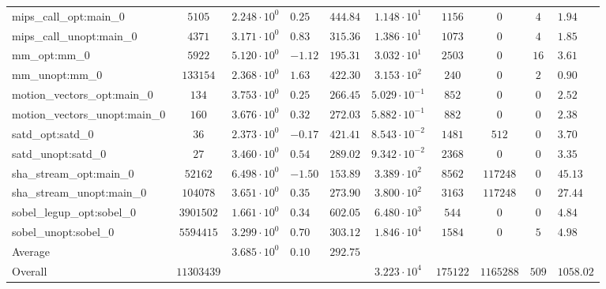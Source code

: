 \begin{tabular}{|l|c|HHc|c|c|c|cH|}
mips\_call\_opt:main\_0                         & $ 5105     $ & $ 2.248 \cdot 10^{0} $ & $ 0.25  $ & $ 444.84 $ & $ 1.148 \cdot 10^{1}  $ & $ 1156   $ & $ 0       $ & $ 4   $ & $ 1.94    $ \\
mips\_call\_unopt:main\_0                       & $ 4371     $ & $ 3.171 \cdot 10^{0} $ & $ 0.83  $ & $ 315.36 $ & $ 1.386 \cdot 10^{1}  $ & $ 1073   $ & $ 0       $ & $ 4   $ & $ 1.85    $ \\
mm\_opt:mm\_0                                   & $ 5922     $ & $ 5.120 \cdot 10^{0} $ & $ -1.12 $ & $ 195.31 $ & $ 3.032 \cdot 10^{1}  $ & $ 2503   $ & $ 0       $ & $ 16  $ & $ 3.61    $ \\
mm\_unopt:mm\_0                                 & $ 133154   $ & $ 2.368 \cdot 10^{0} $ & $ 1.63  $ & $ 422.30 $ & $ 3.153 \cdot 10^{2}  $ & $ 240    $ & $ 0       $ & $ 2   $ & $ 0.90    $ \\
motion\_vectors\_opt:main\_0                    & $ 134      $ & $ 3.753 \cdot 10^{0} $ & $ 0.25  $ & $ 266.45 $ & $ 5.029 \cdot 10^{-1} $ & $ 852    $ & $ 0       $ & $ 0   $ & $ 2.52    $ \\
motion\_vectors\_unopt:main\_0                  & $ 160      $ & $ 3.676 \cdot 10^{0} $ & $ 0.32  $ & $ 272.03 $ & $ 5.882 \cdot 10^{-1} $ & $ 882    $ & $ 0       $ & $ 0   $ & $ 2.38    $ \\
satd\_opt:satd\_0                               & $ 36       $ & $ 2.373 \cdot 10^{0} $ & $ -0.17 $ & $ 421.41 $ & $ 8.543 \cdot 10^{-2} $ & $ 1481   $ & $ 512     $ & $ 0   $ & $ 3.70    $ \\
satd\_unopt:satd\_0                             & $ 27       $ & $ 3.460 \cdot 10^{0} $ & $ 0.54  $ & $ 289.02 $ & $ 9.342 \cdot 10^{-2} $ & $ 2368   $ & $ 0       $ & $ 0   $ & $ 3.35    $ \\
sha\_stream\_opt:main\_0                        & $ 52162    $ & $ 6.498 \cdot 10^{0} $ & $ -1.50 $ & $ 153.89 $ & $ 3.389 \cdot 10^{2}  $ & $ 8562   $ & $ 117248  $ & $ 0   $ & $ 45.13   $ \\
sha\_stream\_unopt:main\_0                      & $ 104078   $ & $ 3.651 \cdot 10^{0} $ & $ 0.35  $ & $ 273.90 $ & $ 3.800 \cdot 10^{2}  $ & $ 3163   $ & $ 117248  $ & $ 0   $ & $ 27.44   $ \\
sobel\_legup\_opt:sobel\_0                      & $ 3901502  $ & $ 1.661 \cdot 10^{0} $ & $ 0.34  $ & $ 602.05 $ & $ 6.480 \cdot 10^{3}  $ & $ 544    $ & $ 0       $ & $ 0   $ & $ 4.84    $ \\
sobel\_unopt:sobel\_0                           & $ 5594415  $ & $ 3.299 \cdot 10^{0} $ & $ 0.70  $ & $ 303.12 $ & $ 1.846 \cdot 10^{4}  $ & $ 1584   $ & $ 0       $ & $ 5   $ & $ 4.98    $ \\
\hline
Average                                         & $          $ & $ 3.685 \cdot 10^{0} $ & $ 0.10  $ & $ 292.75 $ & $                     $ & $        $ & $         $ & $     $ & $         $ \\
\hline
Overall                                         & $ 11303439 $ & $                    $ & $       $ & $        $ & $ 3.223 \cdot 10^{4}  $ & $ 175122 $ & $ 1165288 $ & $ 509 $ & $ 1058.02 $ \\
\hline
\end{tabular}
